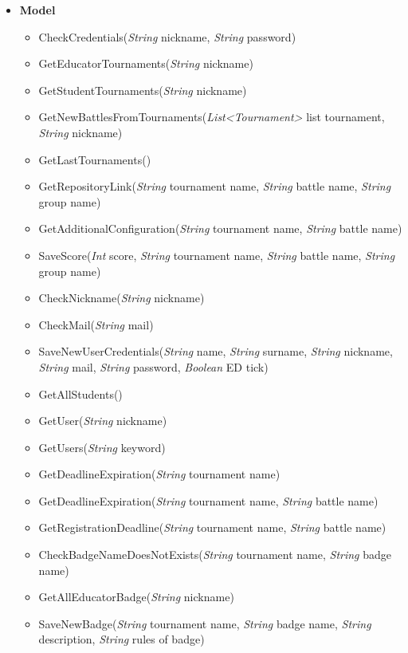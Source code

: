 \begin{itemize}
    \item \textbf{\textbf{Model}}

\begin{itemize}
        \item CheckCredentials(\textit{String} nickname, \textit{String} password)
        \item GetEducatorTournaments(\textit{String} nickname)
        \item GetStudentTournaments(\textit{String} nickname)
        \item GetNewBattlesFromTournaments(\textit{List\textless Tournament\textgreater} list tournament, \textit{String} nickname)
        \item GetLastTournaments()
        \item GetRepositoryLink(\textit{String} tournament name, \textit{String} battle name, \textit{String} group name)
        \item GetAdditionalConfiguration(\textit{String} tournament name, \textit{String} battle name)
        \item SaveScore(\textit{Int}  score, \textit{String} tournament name, \textit{String} battle name, \textit{String} group name)
        \item CheckNickname(\textit{String} nickname)
        \item CheckMail(\textit{String} mail)
        \item SaveNewUserCredentials(\textit{String} name, \textit{String} surname, \textit{String} nickname, \textit{String} mail, \textit{String} password, \textit{Boolean}  ED tick)
        \item GetAllStudents()
        \item GetUser(\textit{String} nickname)
        \item GetUsers(\textit{String} keyword)
        \item GetDeadlineExpiration(\textit{String} tournament name)
        \item GetDeadlineExpiration(\textit{String} tournament name, \textit{String} battle name)
        \item GetRegistrationDeadline(\textit{String} tournament name, \textit{String} battle name)
        \item CheckBadgeNameDoesNotExists(\textit{String} tournament name, \textit{String} badge name)
        \item GetAllEducatorBadge(\textit{String} nickname)
        \item SaveNewBadge(\textit{String} tournament name, \textit{String} badge name, \textit{String} description, \textit{String} rules of badge)

\end{itemize}
\end{itemize}
